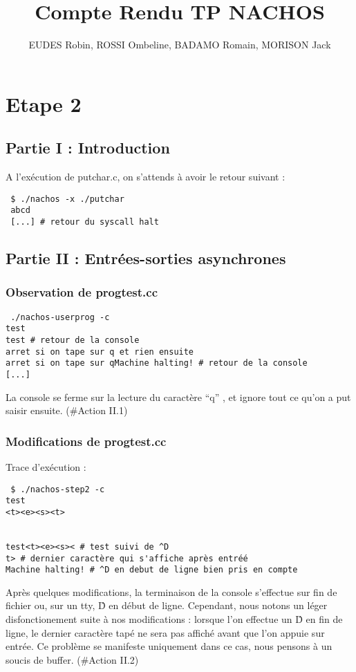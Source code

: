 \documentclass[a4paper,10pt]{article}
\title{Compte Rendu TP NACHOS}
\author{EUDES Robin, ROSSI Ombeline, BADAMO Romain, MORISON Jack}
\begin{document}
\maketitle
\tableofcontents
\newpage
\section{Etape 2}
\subsection{Partie I : Introduction}
A l'exécution de putchar.c, on s'attends à avoir le retour suivant :
\begin{verbatim}
 $ ./nachos -x ./putchar
 abcd
 [...] # retour du syscall halt
\end{verbatim}
\subsection{Partie II : Entrées-sorties asynchrones}
\subsubsection{Observation de progtest.cc}
\begin{verbatim}
 ./nachos-userprog -c
test
test # retour de la console
arret si on tape sur q et rien ensuite
arret si on tape sur qMachine halting! # retour de la console
[...]
\end{verbatim}
La console se ferme sur la lecture du caractère ``q'' , et ignore tout ce qu'on a put saisir ensuite. (\#Action II.1)

\subsubsection{ Modifications de progtest.cc}

Trace d'exécution :


\begin{verbatim}
 $ ./nachos-step2 -c
test
<t><e><s><t>


test<t><e><s>< # test suivi de ^D
t> # dernier caractère qui s'affiche après entréé
Machine halting! # ^D en debut de ligne bien pris en compte

\end{verbatim}

Après quelques modifications, la terminaison de la console s'effectue sur fin de fichier ou, sur un tty, \^D en début de ligne.
Cependant, nous notons un léger disfonctionement suite à nos modifications : lorsque l'on effectue un \^D en fin de ligne, le dernier caractère tapé ne sera pas affiché
avant que l'on appuie sur entrée. Ce problème se manifeste uniquement dans ce cas, nous pensons à un soucis de buffer. (\#Action II.2)
\end{document}
